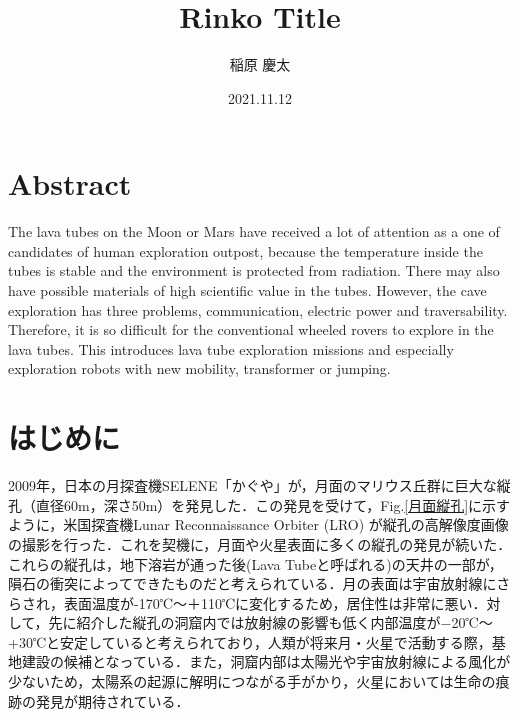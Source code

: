 \documentclass[a4paper,11pt,dvipdfmx.uplatex]{jsarticle}
\title{Rinko Title}
\author{稲原 慶太}
\date{2021.11.12}
\begin{document}
  
 \section*{\bf Abstract}
 The lava tubes on the Moon or Mars have received a lot of attention as a
one of candidates of human exploration outpost, because the temperature inside
the tubes is stable and  the environment is protected from radiation.
There may also have possible materials of high scientific value in the
tubes.
However, the cave exploration has three problems, communication,
electric power and traversability. Therefore, it is so difficult for the
conventional wheeled rovers to explore in the lava tubes. This
introduces lava tube exploration missions and especially exploration
robots with new mobility, transformer or jumping.
 
\section{はじめに}
2009年，日本の月探査機SELENE「かぐや」が，月面のマリウス丘群に巨大な縦孔（直径60m，深さ50m）を発見した\cite{lavatube}．この発見を受けて，Fig.\ref{月面縦孔}に示すように，米国探査機Lunar Reconnaissance Orbiter (LRO) が縦孔の高解像度画像の撮影を行った\cite{kireinalavatuve}．これを契機に，月面や火星表面に多くの縦孔の発見\cite{marslava1}\cite{marslava2}が続いた．これらの縦孔は，地下溶岩が通った後(Lava Tubeと呼ばれる)の天井の一部が，隕石の衝突によってできたものだと考えられている．月の表面は宇宙放射線にさらされ，表面温度が-170℃～＋110℃に変化するため\cite{kawano}，居住性は非常に悪い．対して，先に紹介した縦孔の洞窟内では放射線の影響も低く内部温度が−20℃～+30℃と安定していると考えられており\cite{kawano}，人類が将来月・火星で活動する際，基地建設の候補\cite{uzume}\cite{tateanariyou}となっている．また，洞窟内部は太陽光や宇宙放射線による風化が少ないため，太陽系の起源に解明につながる手がかり，火星においては生命の痕跡の発見が期待されている\cite{DuAxel}\cite{DAEDALUS}．\\ \\
\end{document}
